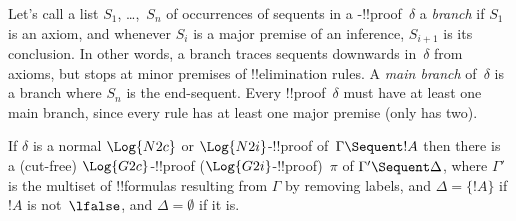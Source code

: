 \documentclass[../../../include/open-logic-section]{subfiles}
\begin{document}
Let's call a list $S_1$, \dots,~$S_n$ of occurrences of sequents in a
-!!{proof}~$\delta$ a \emph{branch} if $S_1$ is an axiom, and
whenever $S_i$ is a major premise of an inference, $S_{i+1}$ is its
conclusion. In other words, a branch traces sequents downwards
in~$\delta$ from axioms, but stops at minor premises of
!!{elimination} rules. A \emph{main branch} of~$\delta$ is a branch
where $S_n$ is the end-sequent. Every !!{proof}~$\delta$ must have at
least one main branch, since every rule has at least one major premise
(only \Intro{\land} has two).


\begin{prop} If $\delta$ is a normal
$\Log{N2c}$ or $\Log{N2i}$-!!{proof} of~$\Gamma \Sequent !A$ then
there is a (cut-free) $\Log{G2c}$-!!{proof}
($\Log{G2i}$-!!{proof})~$\pi$ of $\Gamma' \Sequent \Delta$, where
$\Gamma'$ is the multiset of !!{formula}s resulting from $\Gamma$ by
removing labels, and $\Delta = \{!A\}$ if $!A$ is not~$\lfalse$, and
$\Delta = \emptyset$ if it is.
\end{prop}
\end{document}
